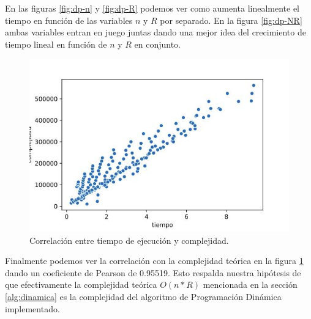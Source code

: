 \documentclass[10pt,a4paper]{article}
\begin{document}
En las figuras \ref{fig:dp-n} y \ref{fig:dp-R} podemos ver como aumenta linealmente el tiempo en función de las variables $n$ y $R$ por separado. En la figura \ref{fig:dp-NR} ambas variables entran en juego juntas dando una mejor idea del crecimiento de tiempo lineal en función de $n$ y $R$ en conjunto.
\newline
\begin{figure}[h!]
	\centering
	\includegraphics[scale=0.35]{img/dp-correlacion.jpg}
	\caption{Correlación entre tiempo de ejecución y complejidad.}
	\label{fig:dp-complejidad}
\end{figure}
\newline
Finalmente podemos ver la correlación con la complejidad teórica en la figura \ref{fig:dp-complejidad} dando un coeficiente de Pearson\cite{ref:pearson} de 0.95519. Esto respalda nuestra hipótesis de que efectivamente la complejidad teórica $O(n*R)$ mencionada en la sección \ref{alg:dinamica} es la complejidad del algoritmo de Programación Dinámica implementado.
\end{document}

